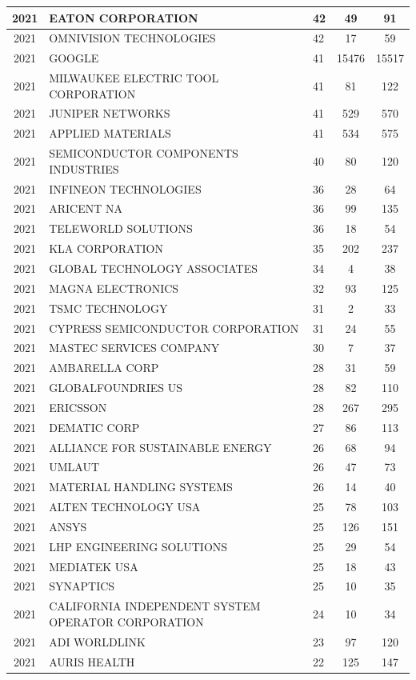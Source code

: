\documentclass{article}%
\begin{document}
\begin{longtable}{c|p{20em}|p{5em}|c|c}
\hline%
2021&EATON CORPORATION&42&49&91\\%
\hline%
2021&OMNIVISION TECHNOLOGIES&42&17&59\\%
\hline%
2021&GOOGLE&41&15476&15517\\%
\hline%
2021&MILWAUKEE ELECTRIC TOOL CORPORATION&41&81&122\\%
\hline%
2021&JUNIPER NETWORKS&41&529&570\\%
\hline%
2021&APPLIED MATERIALS&41&534&575\\%
\hline%
2021&SEMICONDUCTOR COMPONENTS INDUSTRIES&40&80&120\\%
\hline%
2021&INFINEON TECHNOLOGIES&36&28&64\\%
\hline%
2021&ARICENT NA&36&99&135\\%
\hline%
2021&TELEWORLD SOLUTIONS&36&18&54\\%
\hline%
2021&KLA CORPORATION&35&202&237\\%
\hline%
2021&GLOBAL TECHNOLOGY ASSOCIATES&34&4&38\\%
\hline%
2021&MAGNA ELECTRONICS&32&93&125\\%
\hline%
2021&TSMC TECHNOLOGY&31&2&33\\%
\hline%
2021&CYPRESS SEMICONDUCTOR CORPORATION&31&24&55\\%
\hline%
2021&MASTEC SERVICES COMPANY&30&7&37\\%
\hline%
2021&AMBARELLA CORP&28&31&59\\%
\hline%
2021&GLOBALFOUNDRIES US&28&82&110\\%
\hline%
2021&ERICSSON&28&267&295\\%
\hline%
2021&DEMATIC CORP&27&86&113\\%
\hline%
2021&ALLIANCE FOR SUSTAINABLE ENERGY&26&68&94\\%
\hline%
2021&UMLAUT&26&47&73\\%
\hline%
2021&MATERIAL HANDLING SYSTEMS&26&14&40\\%
\hline%
2021&ALTEN TECHNOLOGY USA&25&78&103\\%
\hline%
2021&ANSYS&25&126&151\\%
\hline%
2021&LHP ENGINEERING SOLUTIONS&25&29&54\\%
\hline%
2021&MEDIATEK USA&25&18&43\\%
\hline%
2021&SYNAPTICS&25&10&35\\%
\hline%
2021&CALIFORNIA INDEPENDENT SYSTEM OPERATOR CORPORATION&24&10&34\\%
\hline%
2021&ADI WORLDLINK&23&97&120\\%
\hline%
2021&AURIS HEALTH&22&125&147\\%

\end{longtable}
\end{document}
